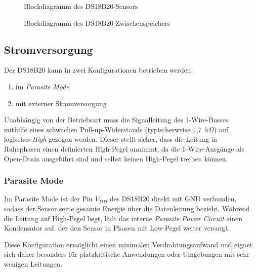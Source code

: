 \begin{figure}[H]
	\centering
	\resizebox{\textwidth}{!}{%
		\begin{tikzpicture}
			\dsTempSensorBlockDiagramm
		\end{tikzpicture}%
	}
	\caption{Blockdiagramm des DS18B20-Sensors  \cite{Maxim:2019}}
	\label{ds18b20:blockdiagramm}
\end{figure}


\begin{figure}[H]
	\centering
	\resizebox{0.85\textwidth}{!}{%
			\fbox{
			\begin{tikzpicture}
				\dsMemoryMap
			\end{tikzpicture}%
		}
	}
	\caption{Blockdiagramm des DS18B20-Zwischenspeichers  \cite{Maxim:2019}}
	\label{ds18b20:memoryMapp}
\end{figure}


\subsection{Stromversorgung}
	Der DS18B20 kann in zwei Konfigurationen betrieben werden:
	\begin{enumerate}
		\item im \textit{Parasite Mode}
		\item mit externer Stromversorgung
	\end{enumerate}
	
	Unabhängig von der Betriebsart muss die Signalleitung des 1-Wire-Busses mithilfe eines schwachen Pull-up-Widerstands (typischerweise 4,7~k$\Omega$) auf logisches \textit{High} gezogen werden. Dieser stellt sicher, dass die Leitung in Ruhephasen einen definierten High-Pegel annimmt, da die 1-Wire-Ausgänge als Open-Drain ausgeführt sind und selbst keinen High-Pegel treiben können.


\subsubsection{Parasite Mode \label{lab:parasiteMode}}
	Im Parasite Mode ist der Pin $V_{DD}$ des DS18B20 direkt mit GND verbunden, sodass der Sensor seine gesamte Energie über die Datenleitung bezieht. Während die Leitung auf High-Pegel liegt, lädt das interne \textit{Parasite Power Circuit} einen Kondensator auf, der den Sensor in Phasen mit Low-Pegel weiter versorgt.
	
	Diese Konfiguration ermöglicht einen minimalen Verdrahtungsaufwand und eignet sich daher besonders für platzkritische Anwendungen oder Umgebungen mit sehr wenigen Leitungen.
	
